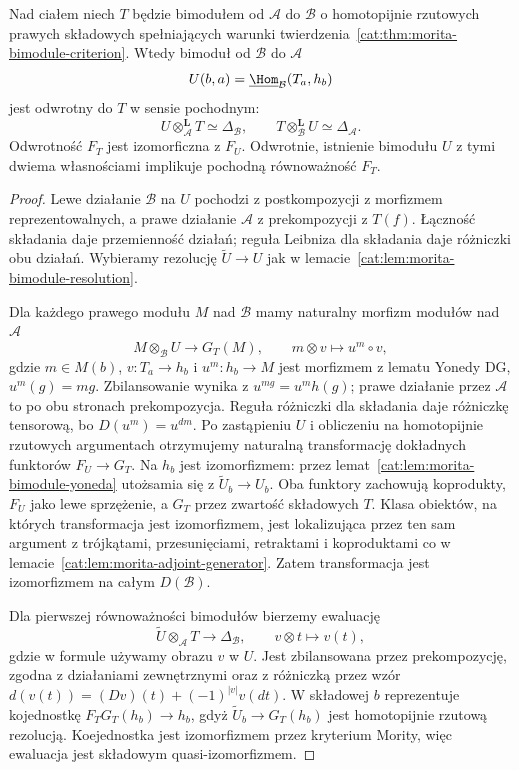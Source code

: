 \begin{twierdzenie}\label{cat:thm:morita-inverse-bimodule}
Nad ciałem niech $T$ będzie bimodułem od $\mathcal A$ do $\mathcal B$ o homotopijnie rzutowych prawych składowych spełniających warunki twierdzenia~\ref{cat:thm:morita-bimodule-criterion}. Wtedy bimoduł od $\mathcal B$ do $\mathcal A$
\[
 U(b,a)=\underline{\Hom}_{\mathcal B}(T_a,h_b)
\]
jest odwrotny do $T$ w sensie pochodnym:
\[
 U\otimes_{\mathcal A}^{\mathbf L}T\simeq\Delta_{\mathcal B},
 \qquad
 T\otimes_{\mathcal B}^{\mathbf L}U\simeq\Delta_{\mathcal A}.
\]
Odwrotność $F_T$ jest izomorficzna z $F_U$. Odwrotnie, istnienie bimodułu $U$ z tymi dwiema własnościami implikuje pochodną równoważność $F_T$.
\end{twierdzenie}
\begin{proof}
Lewe działanie $\mathcal B$ na $U$ pochodzi z postkompozycji z morfizmem reprezentowalnych, a prawe działanie $\mathcal A$ z prekompozycji z $T(f)$. Łączność składania daje przemienność działań; reguła Leibniza dla składania daje różniczki obu działań. Wybieramy rezolucję $\widetilde U\to U$ jak w lemacie~\ref{cat:lem:morita-bimodule-resolution}.

Dla każdego prawego modułu $M$ nad $\mathcal B$ mamy naturalny morfizm modułów nad $\mathcal A$
\[
 M\otimes_{\mathcal B}U\longrightarrow G_T(M),
 \qquad m\otimes v\longmapsto u^m\circ v,
\]
gdzie $m\in M(b)$, $v:T_a\to h_b$ i $u^m:h_b\to M$ jest morfizmem z lematu Yonedy DG, $u^m(g)=mg$. Zbilansowanie wynika z $u^{mg}=u^m h(g)$; prawe działanie przez $\mathcal A$ to po obu stronach prekompozycja. Reguła różniczki dla składania daje różniczkę tensorową, bo $D(u^m)=u^{dm}$. Po zastąpieniu $U$ i obliczeniu na homotopijnie rzutowych argumentach otrzymujemy naturalną transformację dokładnych funktorów $F_U\to G_T$. Na $h_b$ jest izomorfizmem: przez lemat~\ref{cat:lem:morita-bimodule-yoneda} utożsamia się z $\widetilde U_b\to U_b$. Oba funktory zachowują koprodukty, $F_U$ jako lewe sprzężenie, a $G_T$ przez zwartość składowych $T$. Klasa obiektów, na których transformacja jest izomorfizmem, jest lokalizująca przez ten sam argument z trójkątami, przesunięciami, retraktami i koproduktami co w lemacie~\ref{cat:lem:morita-adjoint-generator}. Zatem transformacja jest izomorfizmem na całym $D(\mathcal B)$.

Dla pierwszej równoważności bimodułów bierzemy ewaluację
\[
 \widetilde U\otimes_{\mathcal A}T\longrightarrow\Delta_{\mathcal B},
 \qquad v\otimes t\longmapsto v(t),
\]
gdzie w formule używamy obrazu $v$ w $U$. Jest zbilansowana przez prekompozycję, zgodna z działaniami zewnętrznymi oraz z różniczką przez wzór $d(v(t))=(Dv)(t)+(-1)^{|v|}v(dt)$. W składowej $b$ reprezentuje kojednostkę $F_TG_T(h_b)\to h_b$, gdyż $\widetilde U_b\to G_T(h_b)$ jest homotopijnie rzutową rezolucją. Koejednostka jest izomorfizmem przez kryterium Mority, więc ewaluacja jest składowym quasi-izomorfizmem.


\end{proof}
